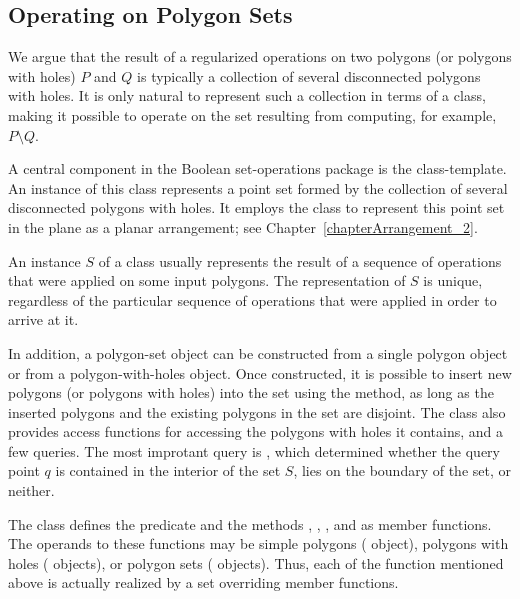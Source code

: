 
\subsection{Operating on Polygon Sets\label{bso_ssec:main_component}}

We argue that the result of a regularized operations on two polygons
(or polygons with holes) $P$ and $Q$ is typically a collection of
several disconnected polygons with holes. It is only natural to
represent such a collection in terms of a class, making it possible to
operate on the set resulting from computing, for example, $P \setminus
Q$.

A central component in the Boolean set-operations package is the
 class-template. An instance of this
class represents a point set formed by the collection of several disconnected
polygons with holes. It employs the  class to represent
this point set in the plane as a planar arrangement; see
Chapter~\ref{chapterArrangement_2}. 

An instance $S$ of a  class usually represents
the result of a sequence of operations that were applied on some input
polygons. The representation of $S$ is unique, regardless of the particular
sequence of operations that were applied in order to arrive at it.

In addition, a polygon-set object can be constructed from a single
polygon object or from a polygon-with-holes object. Once constructed,
it is possible to insert new polygons (or polygons with holes)
into the set using the  method, as long as the inserted
polygons and the existing polygons in the set are disjoint. 
The  class also provides access functions for
accessing the polygons with holes it contains, and a few queries. The
most improtant query is , which determined
whether the query point $q$ is contained in the interior of the set
$S$, lies on the boundary of the set, or neither.

The  class defines the predicate
 and the methods , ,
,  and  as member
functions. The operands to these functions may be simple polygons 
( object), polygons with holes
( objects), or polygon sets
( objects). Thus, each of the function
mentioned above is actually realized by a set overriding member
functions.

